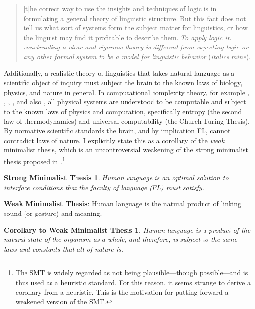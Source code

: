 \documentclass[11pt,twoside]{article}
\begin{document}
\begin{quotation}
[t]he correct way to use the insights and techniques of logic is in formulating a general theory of linguistic structure. But this fact does not tell us what sort of systems form the subject matter for linguistics, or how the linguist may find it 	profitable to describe them. \textsl{To apply logic in constructing a clear and rigorous 	theory is different from expecting logic or any other formal system to be a model for linguistic behavior} (\textsl{italics mine}).
\end{quotation}

Additionally, a realistic theory of linguistics that takes natural language as a scientific object of inquiry must subject the brain to the known laws of biology, physics, and nature in general. In computational complexity theory, for example \cite{deutsch:1985}, \cite{deutsch:1997}, \cite{lloyd:2000}, \cite{lloyd:2006}, and also \cite{kauffman:1995}, all physical systems are understood to be computable and subject to the known laws of physics and computation, specifically entropy (the second law of thermodynamics) and universal computability (the Church-Turing Thesis). By normative scientific standards the brain, and by implication FL, cannot contradict laws of nature. I explicitly state this as a corollary of the \textsl{weak} minimalist thesis, which is an uncontroversial weakening of the strong minimalist thesis proposed in \cite{chomsky08onphases}.\footnote{The SMT is widely regarded as not being plausible---though possible---and is thus used as a heuristic standard. For this reason, it seems strange to derive a corollary from a heuristic. This is the motivation for putting forward a weakened version of the SMT.}

\newtheorem*{smt}{Strong Minimalist Thesis}
\begin{smt}
	Human language is an optimal solution to interface conditions that the faculty of language (FL) must satisfy.
\end{smt}

\begin{proposition}
\textbf{Weak Minimalist Thesis}: Human language is the natural product of linking sound (or gesture) and meaning.
\end{proposition}

\newtheorem*{coroll}{Corollary to Weak Minimalist Thesis}
\begin{coroll}
Human language is a product of the natural state of the organism-as-a-whole, and therefore, is subject to the same laws and constants that all of nature is.
\end{coroll}
\end{document}
